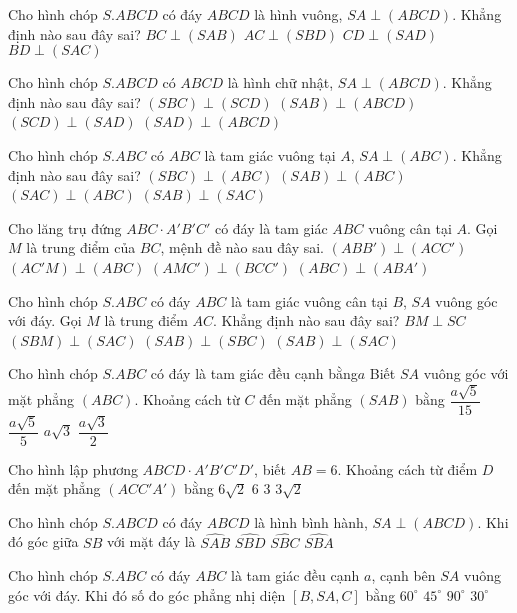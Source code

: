 \begin{ex}
Cho hình chóp $S.ABCD$ có đáy $ABCD$ là hình vuông, $SA\perp (ABCD)$. Khẳng định nào sau đây sai?
\choice
{$BC\perp (SAB)$}
{$AC\perp (SBD)$}
{$CD\perp (SAD)$}
{$BD\perp (SAC)$}
\end{ex}
\begin{ex}
Cho hình chóp $S.ABCD$ có $ABCD$ là hình chữ nhật, $SA\perp (ABCD)$. Khẳng định nào sau đây sai?
\choice
{$(SBC)\perp (SCD)$}
{$(SAB)\perp (ABCD)$}
{$(SCD)\perp (SAD)$}
{$(SAD)\perp (ABCD)$}
\end{ex}
\begin{ex}
Cho hình chóp $S.ABC$ có $ABC$ là tam giác vuông tại $A$, $SA\perp (ABC)$. Khẳng định nào sau đây sai?
\choice
{$(SBC)\perp (ABC)$}
{$(SAB)\perp (ABC)$}
{$(SAC)\perp (ABC)$}
{$(SAB)\perp (SAC)$}
\end{ex}
\begin{ex}
Cho lăng trụ đứng $ABC \cdot A'B'C'$ có đáy là tam giác $ABC$ vuông cân tại $A$. Gọi $M$ là trung điểm của $BC$, mệnh đề nào sau đây sai.
\choice
{$\left(ABB'\right)\perp \left(ACC'\right)$}
{$\left(AC'M\right)\perp (ABC)$}
{$\left(AMC'\right)\perp \left(BCC'\right)$}
{$(ABC)\perp \left(ABA'\right)$}
\end{ex}
\begin{ex}
Cho hình chóp $S.ABC$ có đáy $ABC$ là tam giác vuông cân tại $B$, $SA$ vuông góc với đáy. Gọi $M$ là trung điểm $AC$. Khẳng định nào sau đây sai?
\choice
{$BM\perp SC$}
{$(SBM)\perp (SAC)$}
{$(SAB)\perp (SBC)$}
{$(SAB)\perp (SAC)$}
\end{ex}
\begin{ex}
Cho hình chóp $S.ABC$ có đáy là tam giác đều cạnh bằng$a$ Biết $SA$ vuông góc với mặt phẳng $(ABC)$. Khoảng cách từ $C$ đến mặt phẳng $(SAB)$ bằng
\choice
{$\dfrac{a\sqrt{5}}{15}$}
{$\dfrac{a\sqrt{5}}{5}$}
{$a\sqrt{3}$}
{$\dfrac{a\sqrt{3}}{2}$}
\end{ex}
\begin{ex}
Cho hình lập phương $ABCD \cdot A'B'C'D'$, biết $AB=6$. Khoảng cách từ điểm $D$ đến mặt phẳng $\left(ACC'A'\right)$ bằng
\choice
{$6\sqrt{2}$}
{$6$}
{$3$}
{$3\sqrt{2}$}
\end{ex}
\begin{ex}
Cho hình chóp $S.ABCD$ có đáy $ABCD$ là hình bình hành, $SA\perp (ABCD)$. Khi đó góc giữa $SB$ với mặt đáy là
\choice
{$\widehat{SAB}$}
{$\widehat{SBD}$}
{$\widehat{SBC}$}
{$\widehat{SBA}$}
\end{ex}
\begin{ex}
Cho hình chóp $S.ABC$ có đáy $ABC$ là tam giác đều cạnh $a$, cạnh bên $SA$ vuông góc với đáy. Khi đó số đo góc phẳng nhị diện $\left[B, SA, C\right]$ bằng
\choice
{$60^\circ$}
{$45^\circ$}
{${{90}^\circ}$}
{${{30}^\circ}$}
\end{ex}
